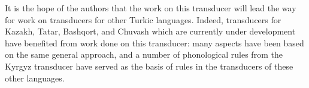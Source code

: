 \documentclass[10pt,a4paper,twocolumn]{article}
\begin{document}
It is the hope of the authors that the work on this transducer will lead the way for work on transducers for other Turkic languages.  Indeed, transducers for Kazakh, Tatar, Bashqort, and Chuvash which are currently under development have benefited from work done on this transducer: many aspects have been based on the same general approach, and a number of phonological rules from the Kyrgyz transducer have served as the basis of rules in the transducers of these other languages.




\end{document}

